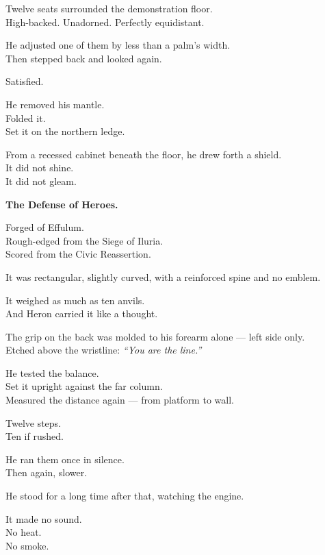 \documentclass[12pt]{article}
\begin{document}
\vspace{1em}

Twelve seats surrounded the demonstration floor.\\
High-backed. Unadorned. Perfectly equidistant.

He adjusted one of them by less than a palm’s width.\\
Then stepped back and looked again.

Satisfied.

\vspace{1em}

He removed his mantle.\\
Folded it.\\
Set it on the northern ledge.

From a recessed cabinet beneath the floor, he drew forth a shield.\\
It did not shine.\\
It did not gleam.

\textbf{The Defense of Heroes.}

Forged of Effulum.\\
Rough-edged from the Siege of Iluria.\\
Scored from the Civic Reassertion.

It was rectangular, slightly curved, with a reinforced spine and no emblem.

It weighed as much as ten anvils.\\
And Heron carried it like a thought.

The grip on the back was molded to his forearm alone — left side only.\\
Etched above the wristline: \textit{“You are the line.”}

He tested the balance.\\
Set it upright against the far column.\\
Measured the distance again — from platform to wall.

Twelve steps.\\
Ten if rushed.

He ran them once in silence.\\
Then again, slower.

He stood for a long time after that, watching the engine.

\vspace{1em}

It made no sound.\\
No heat.\\
No smoke.
\end{document}
